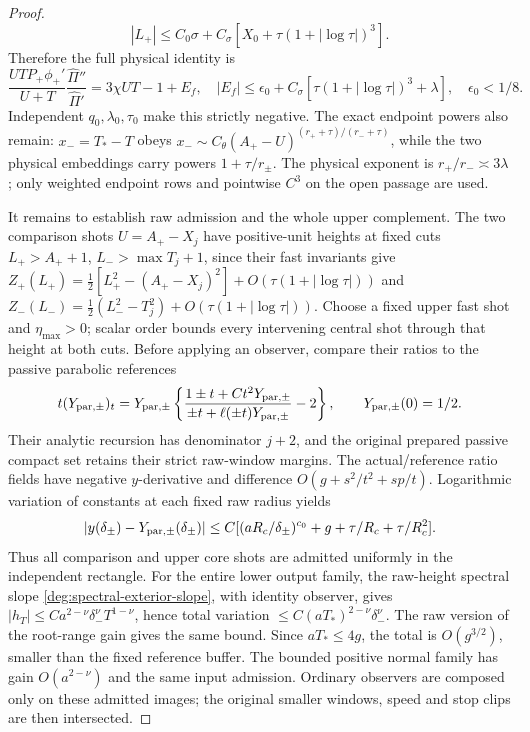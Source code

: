 \begin{proof}
\begin{equation}
 |L_+|\le C_0\sigma+C_\sigma[X_0+\tau(1+|\log\tau|)^3].
\end{equation}
Therefore the full physical identity is
\begin{equation}\label{deg:far-curvature}
 \frac{UTP_+\phi_+'}{U+T}\frac{\widehat\Pi''}{\widehat\Pi'}
 =3\chi UT-1+E_f,\quad
 |E_f|\le\epsilon_0+C_\sigma[\tau(1+|\log\tau|)^3+\lambda],
 \quad\epsilon_0<1/8.
\end{equation}
Independent \(q_0,\lambda_0,\tau_0\) make this strictly negative.
The exact endpoint powers also remain: \(x_-=T_*-T\) obeys
\(x_-\sim C_\theta(A_+-U)^{(r_++\tau)/(r_-+\tau)}\), while
the two physical embeddings carry powers \(1+\tau/r_\pm\).
The physical exponent is \(r_+/r_-\asymp3\lambda\); only weighted
endpoint rows and pointwise \(C^3\) on the open passage are used.

It remains to establish raw admission and the whole upper complement.
The two comparison shots \(U=A_+-X_j\) have positive-unit heights at
fixed cuts \(L_+>A_++1\), \(L_->\max T_j+1\), since their fast
invariants give \(Z_+(L_+)=\tfrac12[L_+^2-(A_+-X_j)^2]+O(\tau(1+|\log\tau|))\)
and \(Z_-(L_-)=\tfrac12(L_-^2-T_j^2)+O(\tau(1+|\log\tau|))\).
Choose a fixed upper fast shot and \(\eta_{\max}>0\); scalar order
bounds every intervening central shot through that height at both cuts.
Before applying an observer, compare their ratios to the passive
parabolic references
\[
 t(Y_{{\rm par},\pm})_t=Y_{{\rm par},\pm}
 \left\{\frac{1\pm t+Ct^2Y_{{\rm par},\pm}}
 {\pm t+\ell(\pm t)Y_{{\rm par},\pm}}-2\right\},\qquad
 Y_{{\rm par},\pm}(0)=1/2.
\]
Their analytic recursion has denominator \(j+2\), and the original
prepared passive compact set retains their strict raw-window margins.
The actual/reference ratio fields have negative \(y\)-derivative and
difference \(O(g+s^2/t^2+sp/t)\). Logarithmic variation of constants
at each fixed raw radius yields
\[
 |y(\delta_\pm)-Y_{{\rm par},\pm}(\delta_\pm)|
 \le C[(aR_c/\delta_\pm)^{c_0}+g+\tau/R_c+\tau/R_c^2].
\]
Thus all comparison and upper core shots are admitted uniformly in the
independent rectangle. For the entire lower output family, the raw-height
spectral slope \eqref{deg:spectral-exterior-slope}, with identity observer, gives
\(|h_T|\le Ca^{2-\nu}\delta_-^\nu T^{1-\nu}\), hence total variation
\(\le C(aT_*)^{2-\nu}\delta_-^\nu\). The raw version of the root-range
gain gives the same bound. Since \(aT_*\le4g\), the total is
\(O(g^{3/2})\), smaller than the fixed reference buffer. The bounded
positive normal family has gain \(O(a^{2-\nu})\) and the same input
admission. Ordinary observers are composed only on these admitted images;
the original smaller windows, speed and stop clips are then intersected.


\end{proof}
